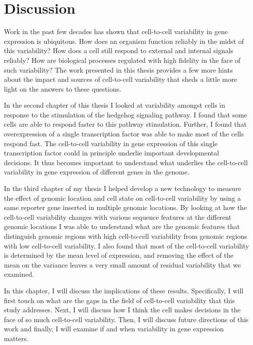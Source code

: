 \chapter{Discussion}
\label{chap:conclusion}
\tightlists

Work in the past few decades has shown that cell-to-cell variability in gene expression is ubiquitous. How does an organism function reliably in the midst of this variability? How does a cell still respond to external and internal signals reliably? How are biological processes regulated with high fidelity in the face of such variability? The work presented in this thesis provides a few more hints about the impact and sources of cell-to-cell variability that sheds a little more light on the answers to these questions.

In the second chapter of this thesis I looked at variability amongst cells in response to the stimulation of the hedgehog signaling pathway. I found that some cells are able to respond faster to this pathway stimulation. Further, I found that overexpression of a single transcription factor was able to make most of the cells respond fast. The cell-to-cell variability in gene expression of this single transcription factor could in principle underlie important developmental decisions. It thus becomes important to understand what underlies the cell-to-cell variability in gene expression of different genes in the genome.

In the third chapter of my thesis I helped develop a new technology to measure the effect of genomic location and cell state on cell-to-cell variability by using a same reporter gene inserted in multiple genomic locations. By looking at how the cell-to-cell variability changes with various sequence features at the different genomic locations I was able to understand what are the genomic features that distinguish genomic regions with high cell-to-cell variability from genomic regions with low cell-to-cell variability. I also found that most of the cell-to-cell variability is determined by the mean level of expression, and removing the effect of the mean on the variance leaves a very small amount of residual variability that we examined.

In this chapter, I will discuss the implications of these results. Specifically, I will first touch on what are the gaps in the field of cell-to-cell variability that this study addresses. Next, I will discuss how I think the cell makes decisions in the face of so much cell-to-cell variability. Then, I will discuss future directions of this work and finally, I will examine if and when variability in gene expression matters.

